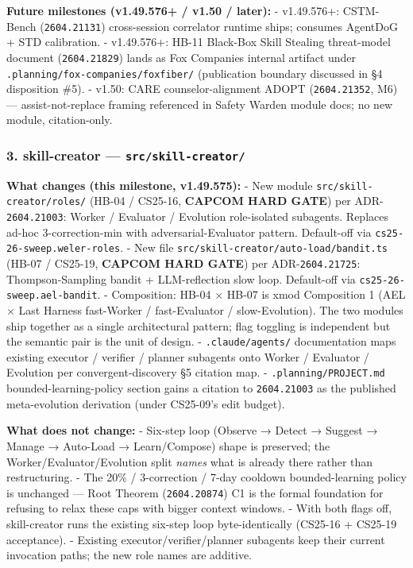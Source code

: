 \documentclass[11pt,letterpaper]{article}
\newcommand{\arxivid}[1]{\texttt{\textcolor{accent}{#1}}}
\begin{document}
\textbf{Future milestones (v1.49.576+ / v1.50 / later):} - v1.49.576+:
CSTM-Bench (\arxivid{2604.21131}) cross-session correlator runtime ships;
consumes AgentDoG + STD calibration. - v1.49.576+: HB-11 Black-Box Skill
Stealing threat-model document (\arxivid{2604.21829}) lands as Fox
Companies internal artifact under
\texttt{.planning/fox-companies/foxfiber/} (publication boundary
discussed in §4 disposition \#5). - v1.50: CARE counselor-alignment
ADOPT (\arxivid{2604.21352}, M6) --- assist-not-replace framing
referenced in Safety Warden module docs; no new module, citation-only.

\subsubsection{\texorpdfstring{3. skill-creator ---
\texttt{src/skill-creator/}}{3. skill-creator --- src/skill-creator/}}

\textbf{What changes (this milestone, v1.49.575):} - New module
\texttt{src/skill-creator/roles/} (HB-04 / CS25-16, \textbf{CAPCOM HARD
GATE}) per ADR-\arxivid{2604.21003}: Worker / Evaluator / Evolution role-isolated
subagents. Replaces ad-hoc 3-correction-min with adversarial-Evaluator
pattern. Default-off via \texttt{cs25-26-sweep.weler-roles}. - New file
\texttt{src/skill-creator/auto-load/bandit.ts} (HB-07 / CS25-19,
\textbf{CAPCOM HARD GATE}) per ADR-\arxivid{2604.21725}: Thompson-Sampling bandit
+ LLM-reflection slow loop. Default-off via
\texttt{cs25-26-sweep.ael-bandit}. - Composition: HB-04 × HB-07 is xmod
Composition 1 (AEL × Last Harness fast-Worker / fast-Evaluator /
slow-Evolution). The two modules ship together as a single architectural
pattern; flag toggling is independent but the semantic pair is the unit
of design. - \texttt{.claude/agents/} documentation maps existing
executor / verifier / planner subagents onto Worker / Evaluator /
Evolution per convergent-discovery §5 citation map. -
\texttt{.planning/PROJECT.md} bounded-learning-policy section gains a
citation to \arxivid{2604.21003} as the published meta-evolution
derivation (under CS25-09's edit budget).

\textbf{What does not change:} - Six-step loop (Observe → Detect →
Suggest → Manage → Auto-Load → Learn/Compose) shape is preserved; the
Worker/Evaluator/Evolution split \emph{names} what is already there
rather than restructuring. - The 20\% / 3-correction / 7-day cooldown
bounded-learning policy is unchanged --- Root Theorem
(\arxivid{2604.20874}) C1 is the formal foundation for refusing to relax
these caps with bigger context windows. - With both flags off,
skill-creator runs the existing six-step loop byte-identically (CS25-16
+ CS25-19 acceptance). - Existing executor/verifier/planner subagents
keep their current invocation paths; the new role names are additive.
\end{document}
